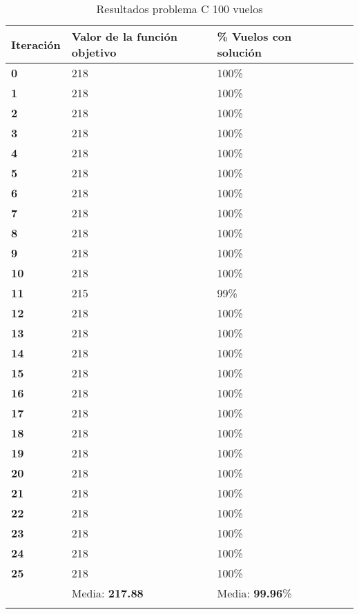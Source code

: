 \begin{longtable}{| p{} | p{} |  p{} | p{}  | p{} | }
	\hline
	\textbf{Iteración} & \textbf{Valor de la función objetivo} &\textbf{\% Vuelos con solución} \\ \hline
	\textbf{0} &218  &100\%  \\ \hline
	\textbf{1} &218  &100\%  \\ \hline
	\textbf{2} &218  &100\%  \\ \hline
	\textbf{3} &218  &100\%  \\ \hline
	\textbf{4} &218  &100\%  \\ \hline
	\textbf{5} &218  &100\%  \\ \hline
	\textbf{6} &218  &100\%  \\ \hline
	\textbf{7} &218  &100\%  \\ \hline
	\textbf{8} &218  &100\%  \\ \hline
	\textbf{9} &218  &100\%  \\ \hline
	\textbf{10} &218  &100\%  \\ \hline
	\textbf{11} &215  &99\%  \\ \hline
	\textbf{12} &218  &100\%  \\ \hline
	\textbf{13} &218  &100\%  \\ \hline
	\textbf{14} &218  &100\%  \\ \hline
	\textbf{15} &218  &100\%  \\ \hline
	\textbf{16} &218  &100\%  \\ \hline
	\textbf{17} &218  &100\%  \\ \hline
	\textbf{18} &218  &100\%  \\ \hline
	\textbf{19} &218  &100\%  \\ \hline
	\textbf{20} &218  &100\%  \\ \hline
	\textbf{21} &218  &100\%  \\ \hline
	\textbf{22} &218  &100\%  \\ \hline
	\textbf{23} &218  &100\%  \\ \hline
	\textbf{24} &218  &100\%  \\ \hline
	\textbf{25} &218  &100\%  \\ \hline
				&Media: \textbf{217.88}  &Media: \textbf{99.96}\%  \\ \hline
	\caption{Resultados problema C 100 vuelos } %
	\label{tab: Resultados problema C 100 vuelos}

	
\end{longtable}


